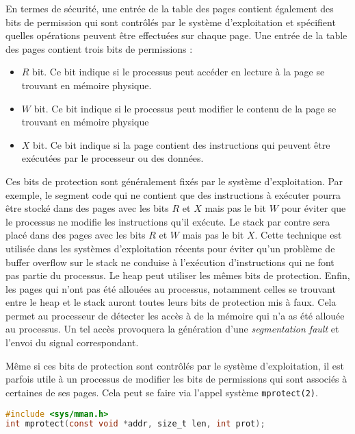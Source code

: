 En termes de sécurité, une entrée de la table des pages contient
également des bits de permission qui sont contrôlés par le système
d'exploitation et spécifient quelles opérations peuvent être
effectuées sur chaque page. Une entrée de la table des pages contient
trois bits de permissions : \newline

\begin{itemize}
    \item $R$ bit. Ce bit indique si le processus peut accéder en
        lecture à la page se trouvant en mémoire physique.
    \item $W$ bit. Ce bit indique si le processus peut modifier le
        contenu de la page se trouvant en mémoire physique
    \item $X$ bit. Ce bit indique si la page contient des instructions qui
        peuvent être exécutées par le processeur ou des données.
\end{itemize}
 
Ces bits de protection sont généralement fixés par le système
d'exploitation. Par exemple, le segment code qui ne contient que des
instructions à exécuter pourra être stocké dans des pages avec les bits
$R$ et $X$ mais pas le bit $W$ pour éviter que le processus ne
modifie les instructions qu'il exécute. Le stack par contre sera placé
dans des pages avec les bits $R$ et $W$ mais pas le bit $X$. Cette
technique est utilisée dans les systèmes d'exploitation récents pour
éviter qu'un problème de buffer overflow sur le stack ne conduise à
l'exécution d'instructions qui ne font pas partie du processus. Le heap
peut utiliser les mêmes bits de protection. Enfin, les pages qui n'ont
pas été allouées au processus, notamment celles se trouvant entre le
heap et le stack auront toutes leurs bits de protection mis à faux.
Cela permet au processeur de détecter les accès à de la mémoire qui n'a
as été allouée au processus. Un tel accès provoquera la génération
d'une \textit{segmentation fault} et l'envoi du signal
correspondant.\newline
 
Même si ces bits de protection sont contrôlés par le système
d'exploitation, il est parfois utile à un processus de modifier les
bits de permissions qui sont associés à certaines de ses pages. Cela
peut se faire via l'appel système \verb#mprotect(2)#.\newline

\begin{lstlisting}[language=C]
#include <sys/mman.h>
int mprotect(const void *addr, size_t len, int prot);
\end{lstlisting}
   
